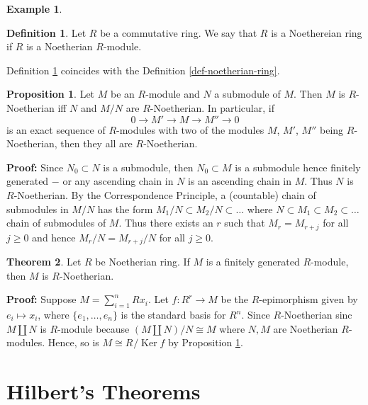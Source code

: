 \documentclass[11pt]{amsbook}%
\theoremstyle{plain}
\theoremstyle{definition}
\newtheorem{definition*}{Definition}
\newtheorem*{example*}{Example}
\newtheorem{proposition}[theorem]{Proposition}
\newtheorem{theorem}{Theorem}
\numberwithin{equation}{section}
\renewcommand{\proof}{ \textbf{Proof: }}
\DeclareMathOperator{\Ker}{Ker}
\begin{document}
\begin{example*}
\begin{definition*}
  \label{def-noeth-ring}
  Let $R$ be a commutative ring. We say that $R$ is a Noethereian ring
  if $R$ is a Noetherian $R$-module.
\end{definition*}
Definition \ref{def-noeth-ring} coincides with the Definition \ref{def-noetherian-ring}.

\begin{proposition}
  \label{prop-sequence-noetherian}
  Let $M$ be an $R$-module and $N$ a submodule of $M$. Then $M$ is $R$-Noetherian iff
  $N$ and $M/N$ are $R$-Noetherian. In particular, if
  $$
  0 \longrightarrow M' \longrightarrow M \longrightarrow M'' \longrightarrow 0
  $$
  is an exact sequence of $R$-modules with two of the modules $M$, $M'$, $M''$ being
  $R$-Noetherian, then they all are $R$-Noetherian.
\end{proposition} \vspace{1.8em}
\proof Since $N_{0} \subset N$ is a submodule, then $N_{0} \subset M$ is a submodule
hence finitely generated $-$ or any ascending chain in $N$ is
an ascending chain in $M$. Thus $N$ is $R$-Noetherian. By the Correspondence
Principle, a (countable) chain of submodules in $M/N$ has the form
$M_{1}/N \subset M_{2}/N \subset \dots$ where $N \subset M_{1} \subset M_{2} \subset \dots$
chain of submodules of $M$. Thus there exists an $r$ such that $M_{r} = M_{r+j}$
for all $j \geq 0$ and hence $M_{r}/N = M_{r+j}/N$ for all $j \geq 0$. \qedsymbol

\begin{theorem}
  Let $R$ be Noetherian ring. If $M$ is a finitely generated $R$-module,
  then $M$ is $R$-Noetherian.
\end{theorem} \vspace{1.8em}
\proof Suppose $M = \sum_{i=1}^{n} Rx_{i}$. Let $f: R^{r} \longrightarrow M$ be the
$R$-epimorphism given by $e_{i} \mapsto x_{i}$, where $\{e_{1}, \dots, e_{n}\}$
is the standard basis for $R^{n}$. Since $R$-Noetherian sinc
$M \amalg N$ is $R$-module because $(M \amalg N)/N \cong M$ where $N, M$ are Noetherian $R$-modules.
Hence, so is $M \cong R^{}/\Ker f$ by Proposition \ref{prop-sequence-noetherian}.

\section{Hilbert's Theorems}


\end{example*}
\end{document}

